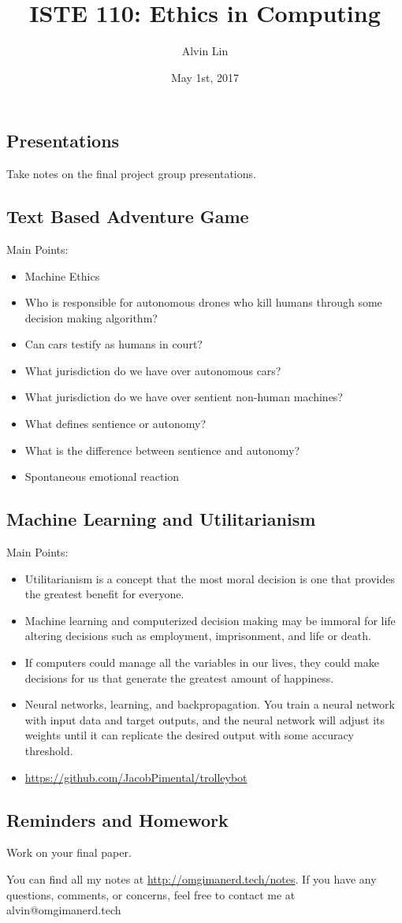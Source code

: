 \documentclass[letterpaper, 12pt]{article}
\title{ISTE 110: Ethics in Computing}
\author{Alvin Lin}
\date{May 1st, 2017}
\begin{document}
\maketitle

\subsection*{Presentations}
Take notes on the final project group presentations.

\subsection*{Text Based Adventure Game}
Main Points:
\begin{itemize}
  \item Machine Ethics
  \item Who is responsible for autonomous drones who kill humans through some
    decision making algorithm?
  \item Can cars testify as humans in court?
  \item What jurisdiction do we have over autonomous cars?
  \item What jurisdiction do we have over sentient non-human machines?
  \item What defines sentience or autonomy?
  \item What is the difference between sentience and autonomy?
  \item Spontaneous emotional reaction
\end{itemize}

\subsection*{Machine Learning and Utilitarianism}
Main Points:
\begin{itemize}
  \item Utilitarianism is a concept that the most moral decision is one that
    provides the greatest benefit for everyone.
  \item Machine learning and computerized decision making may be immoral for
    life altering decisions such as employment, imprisonment, and life or death.
  \item If computers could manage all the variables in our lives, they could
    make decisions for us that generate the greatest amount of happiness.
  \item Neural networks, learning, and backpropagation. You train a neural
    network with input data and target outputs, and the neural network will
    adjust its weights until it can replicate the desired output with some
    accuracy threshold.
  \item \url{https://github.com/JacobPimental/trolleybot}
\end{itemize}

\subsection*{Reminders and Homework}
Work on your final paper.

\begin{center}
  You can find all my notes at \url{http://omgimanerd.tech/notes}. If you have
  any questions, comments, or concerns, feel free to contact me at
  alvin@omgimanerd.tech
\end{center}
\end{document}
